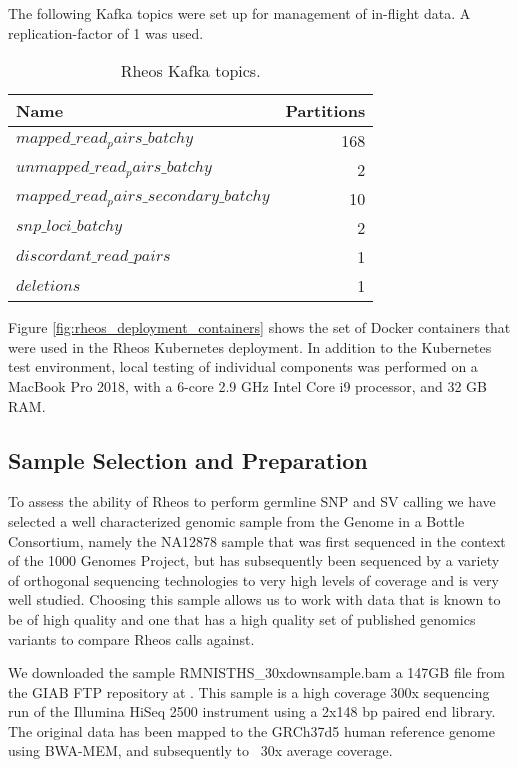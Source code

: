 The following Kafka topics were set up for management of in-flight data. A replication-factor of 1 was used.

\begin{table}[!ht]
    \centering
    \caption{Rheos Kafka topics.}
    \label{tab:rheos_kafka_topics}
    {\begin{tabular}{l | r }
    \toprule
    Name & Partitions \\
    \midrule
    $mapped\_read_pairs\_batchy$ & 168\\
    $unmapped\_read_pairs\_batchy$ & 2\\
    $mapped\_read_pairs\_secondary\_batchy$ & 10\\
    $snp\_loci\_batchy$ & 2\\
    $discordant\_read\_pairs$ & 1\\
    $deletions$ & 1\\
    \bottomrule
    \end{tabular}}
\end{table}

Figure \ref{fig:rheos_deployment_containers} shows the set of Docker containers that were used in the Rheos Kubernetes deployment. In addition to the Kubernetes test environment, local testing of individual components was performed on a MacBook Pro 2018, with a 6-core 2.9 GHz Intel Core i9 processor, and 32 GB RAM. 

\subsection{Sample Selection and Preparation}

To assess the ability of Rheos to perform germline SNP and SV calling we have selected a well characterized genomic sample from the Genome in a Bottle Consortium\autocite{zook2018reproducible}, namely the NA12878 sample that was first sequenced in the context of the 1000 Genomes Project, but has subsequently been sequenced by a variety of orthogonal sequencing technologies to very high levels of coverage and is very well studied. Choosing this sample allows us to work with data that is known to be of high quality and one that has a high quality set of published genomics variants to compare Rheos calls against.

We downloaded the sample RMNISTHS\_30xdownsample.bam a 147GB file from the GIAB FTP repository at \autocite{giab_ftp}. This sample is a high coverage 300x sequencing run of the Illumina HiSeq 2500 instrument using a 2x148 bp paired end library. The original data has been mapped to the GRCh37d5 human reference genome using BWA-MEM, and subsequently 
 to ~30x average coverage. 

